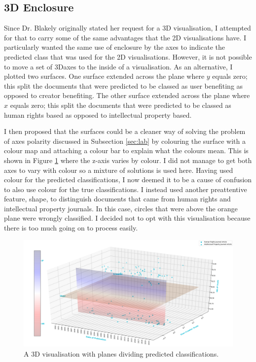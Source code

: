 		\subsection{3D Enclosure}
			Since Dr. Blakely originally stated her request for a 3D visualisation, I attempted for that to carry some of the same advantages that the 2D visualisations have. I particularly wanted the same use of enclosure by the axes to indicate the predicted class that was used for the 2D visualisations. However, it is not possible to move a set of 3Daxes to the inside of a visualisation. As an alternative, I plotted two surfaces. One surface extended across the plane where $y$ equals zero; this split the documents that were predicted to be classed as user benefiting as opposed to creator benefiting. The other surface extended across the plane where $x$ equals zero; this split the documents that were predicted to be classed as human rights based as opposed to intellectual property based. 
			
			I then proposed that the surfaces could be a cleaner way of solving the problem of axes polarity discussed in Subsection \ref{sec:lab} by colouring the surface with a colour map and attaching a colour bar to explain what the colours mean. This is shown in Figure \ref{fig:3d-planes} where the z-axis varies by colour. I did not manage to get both axes to vary with colour so a mixture of solutions is used here. Having used colour for the predicted classifications, I now deemed it to be a cause of confusion to also use colour for the true classifications. I instead used another preattentive feature, shape, to distinguish documents that came from human rights and intellectual property journals. In this case, circles that were above the orange plane were wrongly classified. I decided not to opt with this visualisation because there is too much going on to process easily.
			\begin{figure}
    			\centering
    			\includegraphics[width=0.9\linewidth]{resources/images/3d_planes.png}
    			\caption{A 3D visualisation with planes dividing predicted classifications.}
    			\label{fig:3d-planes}
			\end{figure}
			
